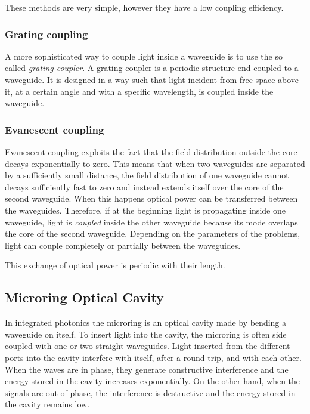 These methods are very simple, however they have a low coupling efficiency. %

\subsubsection{Grating coupling}
\label{sssec:grating_coupling}
A more sophisticated way to couple light inside a waveguide is to use the so called \textit{grating coupler}.
A grating coupler is a periodic structure end coupled to a waveguide.
It is designed in a way such that light incident from free space above it, at a certain angle and with a specific wavelength, is coupled inside the waveguide.

\subsubsection{Evanescent coupling}
\label{sssec:evanescent_coupling}
Evanescent coupling exploits the fact that the field distribution outside the core decays exponentially to zero.
This means that when two waveguides are separated by a sufficiently small distance, the field distribution of one waveguide cannot decays sufficiently fast to zero and instead extends itself over the core of the second waveguide.
When this happens optical power can be transferred between the waveguides.
Therefore, if at the beginning light is propagating inside one waveguide, light is \textit{coupled} inside the other waveguide because its mode overlaps the core of the second waveguide.
Depending on the parameters of the problems, light can couple completely or partially between the waveguides.

This exchange of optical power is periodic with their length.

\subsection{Microring Optical Cavity}
\label{ssec:Microring_Optical_Cavity}
In integrated photonics the microring is an optical cavity made by bending a waveguide on itself.
To insert light into the cavity, the microring is often side coupled with one or two straight waveguides.
Light inserted from the different ports into the cavity interfere with itself, after a round trip, and with each other.
When the waves are in phase, they generate constructive interference and the energy stored in the cavity increases exponentially.
On the other hand, when the signals are out of phase, the interference is destructive and the energy stored in the cavity remains low.


